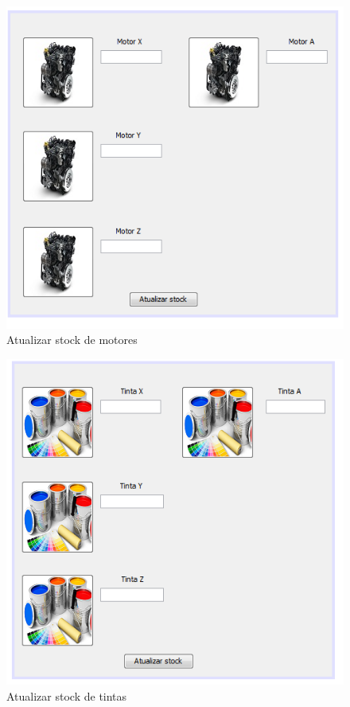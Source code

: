 \begin{figure}
    \centering
    \includegraphics[width=\textwidth]{analise_de_requisitos/img/atualizar_stock_motores.png}
    \caption{Atualizar stock de motores}
\end{figure}

\begin{figure}
    \centering
    \includegraphics[width=\textwidth]{analise_de_requisitos/img/atualizar_stock_tintas.png}
    \caption{Atualizar stock de tintas}
\end{figure}



\clearpage